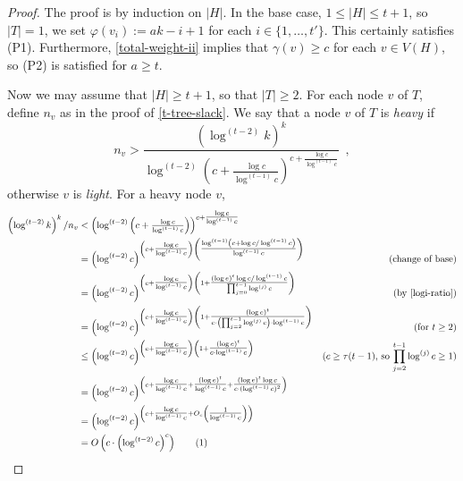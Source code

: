 \documentclass[kpfonts]{patmorin}
\newcommand\numberthis{\addtocounter{equation}{1}\tag{\theequation}}
\theoremstyle{named}
\begin{document}
\begin{proof}
    The proof is by induction on $|H|$. In the base case, $1\le|H|\le t+1$, so $|T|=1$, we set $\varphi(v_i):=ak-i+1$ for each $i\in\{1,\ldots,t'\}$.  This certainly satisfies (P1).  Furthermore, \cref{total-weight-ii} implies that $\gamma(v)\ge c$ for each $v\in V(H)$, so (P2) is satisfied for $a\ge t$.

    Now we may assume that $|H|\ge t+1$, so that $|T|\ge 2$.  For each node $v$ of $T$, define $n_v$ as in the proof of \cref{t-tree-slack}.   We say that a node $v$ of $T$ is \emph{heavy} if
    \[
        n_v> \frac{\left(\log^{(t-2)} k\right)^k}{\log^{(t-2)}\left(c+\tfrac{\log c}{\log^{(t-1)} c}\right)^{c+\tfrac{\log c}{\log^{(t-1)} c}}} \enspace ,
    \]
    otherwise $v$ is \emph{light}.  For a heavy node $v$,
    \begin{align*}
        \left(\log^{(t-2)} k\right)^k/n_v
        & < \left(\log^{(t-2)}\left(c+\tfrac{\log c}{\log^{(t-1)} c}\right)\right)^{c+\tfrac{\log c}{\log^{(t-1)} c}} \\
        & = \left(\log^{(t-2)}c\right)^{\left(c+\tfrac{\log c}{\log^{(t-1)} c}\right)
        \left(\tfrac{\log^{(t-1)}\left(c+\log c/\log^{(t-1)} c\right)}{\log^{(t-1)} c}\right)} &\text{(change of base)} \\
        & = \left(\log^{(t-2)}c\right)^{\left(c+\tfrac{\log c}{\log^{(t-1)} c}\right)
        \left(
        1 + \tfrac{(\log e)^t\log c/\log^{(t-1)} c}{\prod_{j=0}^{t-1}\log^{(j)}c}
        \right)} & \text{(by \cref{logi-ratio})} \\
        & = \left(\log^{(t-2)}c\right)^{\left(c+\tfrac{\log c}{\log^{(t-1)} c}\right)
        \left(
        1 + \tfrac{(\log e)^t}{c\cdot\left(\prod_{j=2}^{t-1}\log^{(j)}c\right)\cdot\log^{(t-1)} c}
        \right)} & \text{(for $t\ge 2$)} \\
        & \le \left(\log^{(t-2)}c\right)^{\left(c+\tfrac{\log c}{\log^{(t-1)} c}\right)
        \left(
        1 + \tfrac{(\log e)^t}{c\cdot\log^{(t-1)} c}
        \right)} & \text{($c\ge \tau(t-1)$, so $\prod_{j=2}^{t-1}\log^{(j)}c\ge 1$)} \\
        & = \left(\log^{(t-2)}c\right)^{\left(c+\tfrac{\log c}{\log^{(t-1)} c}+
        \tfrac{(\log e)^t}{\log^{(t-1)} c} + \tfrac{(\log e)^t\log c}{c\cdot(\log^{(t-1)} c)^2}
        \right)}  \\
        & = \left(\log^{(t-2)}c\right)^{\left(c+\tfrac{\log c}{\log^{(t-1)} c}
          + O_c\left(\tfrac{1}{\log^{(t-1)} c}\right)
        \right)}  \\
        & = O\left(c\cdot\left(\log^{(t-2)}c\right)^c\right)  \numberthis \label{heavy-size}
    \end{align*}


\end{proof}
\end{document}
